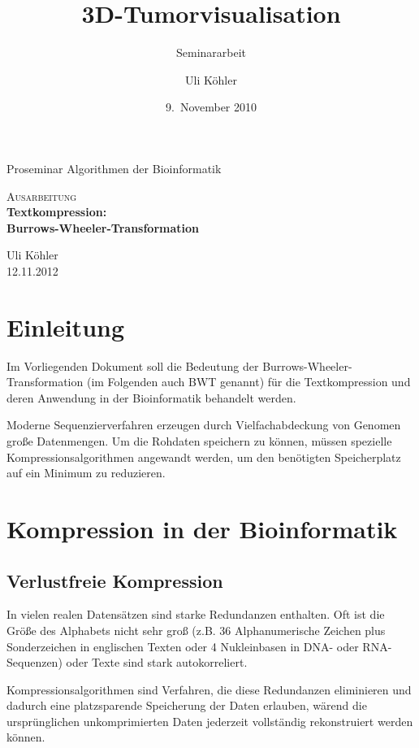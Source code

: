 \documentclass[ngerman,pdftex,paper=A4,DIV=calc,titlepage,12pt]{scrartcl}
\title{3D-Tumorvisualisation}
\subtitle{Seminararbeit}
\author{Uli Köhler}
\date{9.~November 2010}
\newtheorem[L]{boxedDefinition}{Definition}
\begin{document}
\begin{titlepage}
\begin{center}
 Proseminar \glqq Algorithmen der Bioinformatik\grqq
 \end{center}
\vspace{2cm}
\begin{center}
 \large\textsc{Ausarbeitung}\\[5mm]
 {\Huge\centering\bfseries\selectfont Textkompression:\\Burrows-Wheeler-Transformation}\\[2cm]
\begin{center}
  Uli Köhler\\
  12.11.2012
\end{center}
\vspace{2cm}
\end{center}
\tableofcontents
\end{titlepage}
\section{Einleitung}
Im Vorliegenden Dokument soll die Bedeutung der Burrows-Wheeler-Transformation (im Folgenden auch BWT genannt) für die Textkompression und deren Anwendung in der Bioinformatik behandelt werden.

Moderne Sequenzierverfahren erzeugen durch Vielfachabdeckung von Genomen große Datenmengen. Um die Rohdaten speichern zu können, müssen spezielle Kompressionsalgorithmen angewandt werden, um den benötigten Speicherplatz auf ein Minimum zu reduzieren.
\section{Kompression in der Bioinformatik}
\subsection{Verlustfreie Kompression} \label{ssec:bigdata-bioinformatics}
In vielen realen Datensätzen sind starke Redundanzen enthalten. Oft ist die Größe des Alphabets nicht sehr groß (z.B. 36 Alphanumerische Zeichen plus Sonderzeichen in englischen Texten oder 4 Nukleinbasen in DNA- oder RNA-Sequenzen) oder Texte sind stark autokorreliert.

Kompressionsalgorithmen sind Verfahren, die diese Redundanzen eliminieren und dadurch eine platzsparende Speicherung der Daten erlauben, wärend die ursprünglichen unkomprimierten Daten jederzeit vollständig rekonstruiert werden können.
\end{document}
